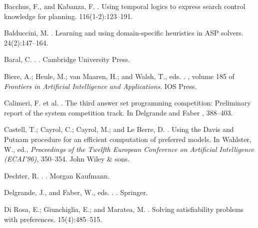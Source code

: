 \begin{thebibliography}{}

Bacchus, F., and Kabanza, F.
.
\newblock Using temporal logics to express search control knowledge for
  planning.
 116(1-2):123--191.

Balduccini, M.
.
\newblock Learning and using domain-specific heuristics in {ASP} solvers.
 24(2):147--164.

Baral, C.
.
.
\newblock Cambridge University Press.

Biere, A.; Heule, M.; {van Maaren}, H.; and Walsh, T., eds.
.
, volume 185 of {\em Frontiers in
  Artificial Intelligence and Applications}.
\newblock IOS Press.

Calimeri, F. et al.
.
\newblock The third answer set programming competition: Preliminary report of
  the system competition track.
\newblock In Delgrande and Faber ,  388--403.

Castell, T.; Cayrol, C.; Cayrol, M.; and {Le Berre}, D.
.
\newblock Using the {D}avis and {P}utnam procedure for an efficient computation
  of preferred models.
\newblock In Wahlster, W., ed., {\em Proceedings of the Twelfth European
  Conference on Artificial Intelligence (ECAI'96)},  350--354.
\newblock John Wiley \& sons.

Dechter, R.
.
.
\newblock Morgan Kaufmann.

Delgrande, J., and Faber, W., eds.
.
. Springer.

{Di Rosa}, E.; Giunchiglia, E.; and Maratea, M.
.
\newblock Solving satisfiability problems with preferences.
 15(4):485--515.


\end{thebibliography}
